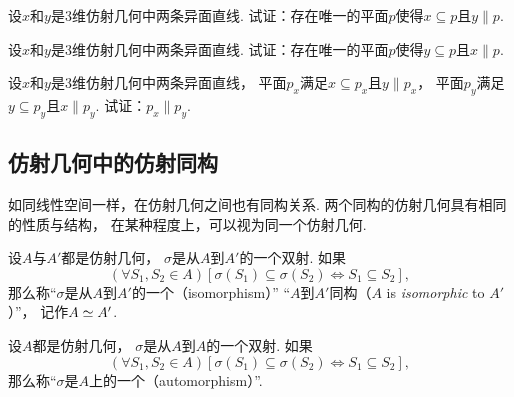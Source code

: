 \begin{example}
设\(x\)和\(y\)是3维仿射几何中两条异面直线.
试证：存在唯一的平面\(p\)使得\(x \subseteq p\)且\(y \parallel p\).
\end{example}

\begin{example}
设\(x\)和\(y\)是3维仿射几何中两条异面直线.
试证：存在唯一的平面\(p\)使得\(y \subseteq p\)且\(x \parallel p\).
\end{example}

\begin{example}
设\(x\)和\(y\)是3维仿射几何中两条异面直线，
平面\(p_x\)满足\(x \subseteq p_x\)且\(y \parallel p_x\)，
平面\(p_y\)满足\(y \subseteq p_y\)且\(x \parallel p_y\).
试证：\(p_x \parallel p_y\).
\end{example}

\subsection{仿射几何中的仿射同构}
如同线性空间一样，在仿射几何之间也有同构关系.
两个同构的仿射几何具有相同的性质与结构，
在某种程度上，可以视为同一个仿射几何.

\begin{definition}
设\(A\)与\(A'\)都是仿射几何，
\(\sigma\)是从\(A\)到\(A'\)的一个双射.
如果\begin{equation*}
	(\forall S_1,S_2 \in A)
	[
		\sigma(S_1) \subseteq \sigma(S_2)
		\iff
		S_1 \subseteq S_2
	],
\end{equation*}
那么称“\(\sigma\)是从\(A\)到\(A'\)的一个（isomorphism）”
“\(A\)到\(A'\)同构（\(A\) is \emph{isomorphic} to \(A'\)）”，
记作\(A \simeq A'\).
\end{definition}

\begin{definition}
设\(A\)都是仿射几何，
\(\sigma\)是从\(A\)到\(A\)的一个双射.
如果\begin{equation*}
	(\forall S_1,S_2 \in A)
	[
		\sigma(S_1) \subseteq \sigma(S_2)
		\iff
		S_1 \subseteq S_2
	],
\end{equation*}
那么称“\(\sigma\)是\(A\)上的一个（automorphism）”.
\end{definition}

